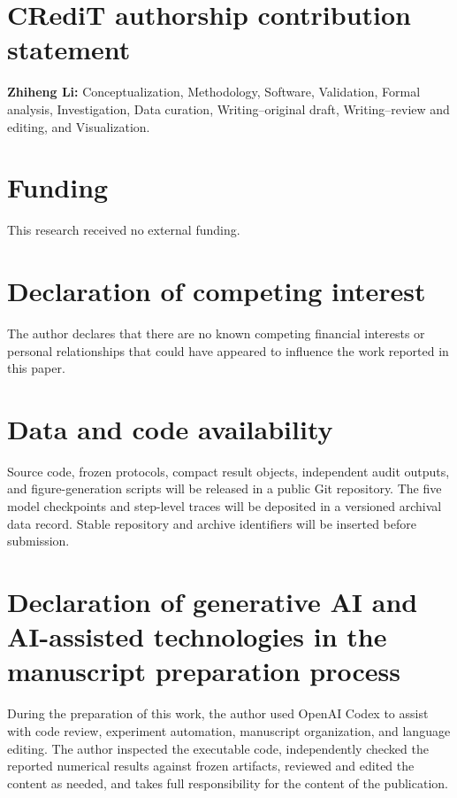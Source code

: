 \section*{CRediT authorship contribution statement}

\textbf{Zhiheng Li:} Conceptualization, Methodology, Software, Validation,
Formal analysis, Investigation, Data curation, Writing--original draft,
Writing--review and editing, and Visualization.

\section*{Funding}

This research received no external funding.

\section*{Declaration of competing interest}

The author declares that there are no known competing financial interests or
personal relationships that could have appeared to influence the work
reported in this paper.

\section*{Data and code availability}

Source code, frozen protocols, compact result objects, independent audit
outputs, and figure-generation scripts will be released in a public Git
repository. The five model checkpoints and step-level traces will be deposited
in a versioned archival data record. Stable repository and archive identifiers
will be inserted before submission.

\section*{Declaration of generative AI and AI-assisted technologies in the
manuscript preparation process}

During the preparation of this work, the author used OpenAI Codex to assist
with code review, experiment automation, manuscript organization, and language
editing. The author inspected the executable code, independently checked the
reported numerical results against frozen artifacts, reviewed and edited the
content as needed, and takes full responsibility for the content of the
publication.

